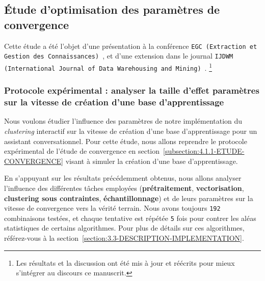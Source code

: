 \begin{tcolorbox}[
		title=\faVial~\textbf{Hypothèse d'efficience}~\faVial,
		colback=colorTcolorboxHypothesis!15,
		colframe=colorTcolorboxHypothesis!75,
		width=\linewidth
	]
	\end{tcolorbox}
	
	\subsection{Étude d'optimisation des paramètres de convergence}
	\label{subsection:4.2.1-ETUDE-OPTIMISATION}
			
		\begin{leftBarInformation}
			Cette étude a été l'objet d'une présentation à la conférence \texttt{EGC (Extraction et Gestion des Connaissances)}~\citep{schild:conception-interactive-clustering:2021}, et d'une extension dans le journal \texttt{IJDWM (International Journal of Data Warehousing and Mining)}~\citep{schild:extension-interactive-clustering:2022}.
			\footnote{Les résultats et la discussion ont été mis à jour et réécrits pour mieux s'intégrer au discours ce manuscrit.}
		\end{leftBarInformation}

		\subsubsection{Protocole expérimental : analyser la taille d'effet paramètres sur la vitesse de création d'une base d'apprentissage}

			Nous voulons étudier l'influence des paramètres de notre implémentation du \textit{clustering} interactif sur la vitesse de création d'une base d'apprentissage pour un assistant conversationnel.
			Pour cette étude, nous allons reprendre le protocole expérimental de l'étude de convergence en section~\ref{subsection:4.1.1-ETUDE-CONVERGENCE} visant à simuler la création d'une base d'apprentissage.
			
			En s'appuyant sur les résultats précédemment obtenus, nous allons analyser l'influence des différentes tâches employées (\textbf{prétraitement}, \textbf{vectorisation}, \textbf{clustering sous contraintes}, \textbf{échantillonnage}) et de leurs paramètres sur la vitesse de convergence vers la vérité terrain.
			Nous avons toujours \texttt{192} combinaisons testées, et chaque tentative est répétée \texttt{5} fois pour contrer les aléas statistiques de certains algorithmes.
			Pour plus de détails sur ces algorithmes, référez-vous à la section~\ref{section:3.3-DESCRIPTION-IMPLEMENTATION}.
			
